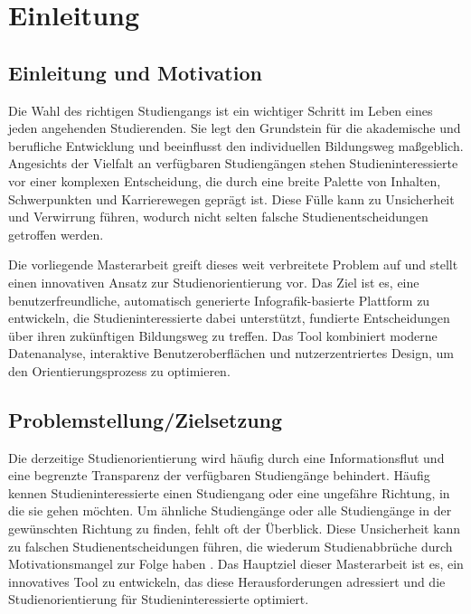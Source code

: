 \section{Einleitung}\label{einleitung}
\subsection{Einleitung und Motivation}\label{einleitung-und-motivation}
Die Wahl des richtigen Studiengangs ist ein wichtiger Schritt im Leben eines
jeden angehenden Studierenden. Sie legt den Grundstein für die akademische und
berufliche Entwicklung und beeinflusst den individuellen Bildungsweg maßgeblich.
Angesichts der Vielfalt an verfügbaren Studiengängen stehen Studieninteressierte
vor einer komplexen Entscheidung, die durch eine breite Palette von Inhalten, 
Schwerpunkten und Karrierewegen geprägt ist. Diese Fülle kann zu Unsicherheit
und Verwirrung führen, wodurch nicht selten falsche Studienentscheidungen
getroffen werden. \parencite{beckmann_verbesserung_2021}

Die vorliegende Masterarbeit greift dieses weit verbreitete Problem auf und
stellt einen innovativen Ansatz zur Studienorientierung vor. Das Ziel ist es,
eine benutzerfreundliche, automatisch generierte Infografik-basierte Plattform
zu entwickeln, die Studieninteressierte dabei unterstützt, fundierte
Entscheidungen über ihren zukünftigen Bildungsweg zu treffen. Das Tool
kombiniert moderne Datenanalyse, interaktive Benutzeroberflächen und
nutzerzentriertes Design, um den Orientierungsprozess zu optimieren.

\subsection{Problemstellung/Zielsetzung}\label{problemstellung-zielsetzung}
Die derzeitige Studienorientierung wird häufig durch eine Informationsflut und
eine begrenzte Transparenz der verfügbaren Studiengänge behindert. Häufig kennen
Studieninteressierte einen Studiengang oder eine ungefähre Richtung, in die sie
gehen möchten. Um ähnliche Studiengänge oder alle Studiengänge in der
gewünschten Richtung zu finden, fehlt oft der Überblick.
\parencite{beckmann_verbesserung_2021} Diese Unsicherheit kann
zu falschen Studienentscheidungen führen, die wiederum Studienabbrüche durch
Motivationsmangel zur Folge haben \parencite{heublein_ursachen_2010}. Das
Hauptziel dieser Masterarbeit ist es, ein innovatives Tool zu entwickeln, das
diese Herausforderungen adressiert und die Studienorientierung für
Studieninteressierte optimiert.

